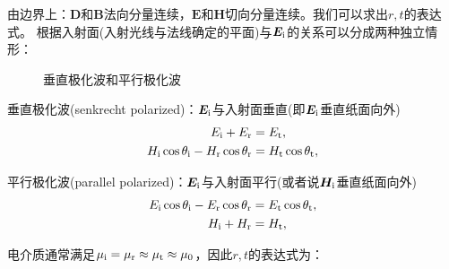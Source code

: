 由边界上：$\bm D$和$\bm B$法向分量连续，$\bm E$和$\bm H$切向分量连续。我们可以求出$r,t$的表达式。
根据入射面(入射光线与法线确定的平面)与$\bm E_{\mathrm{i}}$的关系可以分成两种独立情形：
\begin{figure}[!htp]
    \centering
    \caption{垂直极化波和平行极化波}
    \label{fig:senkrecht and parallel polarization}
\end{figure}
\begin{compactenum}
	\item 垂直极化波(senkrecht polarized)：$\bm E_{\mathrm{i}}$与入射面垂直(即$\bm E_{\mathrm{i}}$垂直纸面向外)%
	\begin{align*}
        E_{\mathrm{i}}+E_\text r&=E_\text t,\\
        H_{\mathrm{i}}\cos\theta_{\mathrm{i}}-H_\text r\cos\theta_\text r&=H_\text t\cos\theta_\text t,
    \end{align*}
    \item 平行极化波(parallel polarized)：$\bm E_{\mathrm{i}}$与入射面平行(或者说$\bm H_{\mathrm{i}}$垂直纸面向外)
    \begin{align*}
        E_{\mathrm{i}}\cos\theta_{\mathrm{i}}-E_\text r\cos\theta_\text r&=E_\text t\cos\theta_\text t,\\
        H_{\mathrm{i}}+H_\text r&=H_\text t,
    \end{align*}
\end{compactenum}
电介质通常满足$\mu_{\mathrm{i}}=\mu_\text r\approx\mu_\text t\approx\mu_0$，因此$r,t$的表达式为：
